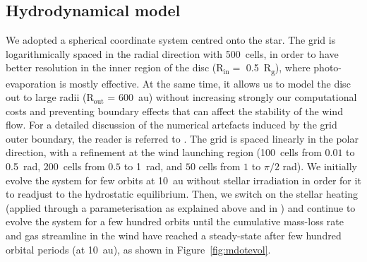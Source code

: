 \documentclass[usenatbib,useAMS,usedcolumn]{mnras}
\begin{document}
\subsection{Hydrodynamical model}\label{sec:hydro-model}

We adopted a spherical coordinate system centred onto the star.
The grid is logarithmically spaced in the radial direction with \SI{500}{cells}, in order to have better resolution in the inner region of the disc (R$_\mathrm{in}=$ \SI{0.5}{R_g}), where photo-evaporation is mostly effective.
At the same time, it allows us to model the disc out to large radii (R$_\mathrm{out}$ = \SI{600}{\astronomicalunit}) without increasing strongly our computational costs and preventing boundary effects that can affect the stability of the wind flow.
For a detailed discussion of the numerical artefacts induced by the grid outer boundary, the reader is referred to .
The grid is spaced linearly in the polar direction, with a refinement at the wind launching region (\SI{100}{cells} from $0.01$ to \SI{0.5}{rad}, \SI{200}{cells} from $0.5$ to \SI{1}{rad}, and $50$ cells from $1$ to $\pi / 2$ rad).
We initially evolve the system for few orbits at \SI{10}{au} without stellar irradiation in order for it to readjust to the hydrostatic equilibrium. Then, we switch on the stellar heating (applied through a parameterisation as explained above and in ) and continue to evolve the system for a few hundred orbits until the cumulative mass-loss rate and gas streamline in the wind have reached a steady-state after few hundred orbital periods (at \SI{10}{au}), as shown in Figure~\ref{fig:mdotevol}.
\end{document}
